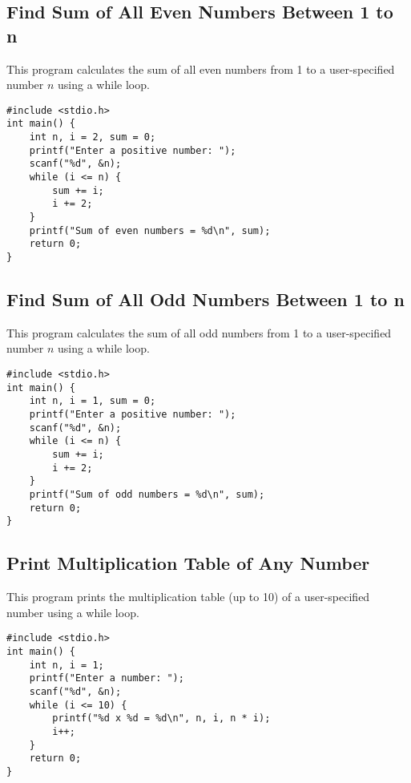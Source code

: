 \documentclass[a4paper,12pt]{article}
\begin{document}
\subsection{Find Sum of All Even Numbers Between 1 to n}
This program calculates the sum of all even numbers from 1 to a user-specified number \(n\) using a while loop.

\begin{lstlisting}[caption={Find Sum of All Even Numbers Between 1 to n}]
#include <stdio.h>
int main() {
    int n, i = 2, sum = 0;
    printf("Enter a positive number: ");
    scanf("%d", &n);
    while (i <= n) {
        sum += i;
        i += 2;
    }
    printf("Sum of even numbers = %d\n", sum);
    return 0;
}
\end{lstlisting}

\newpage

\subsection{Find Sum of All Odd Numbers Between 1 to n}
This program calculates the sum of all odd numbers from 1 to a user-specified number \(n\) using a while loop.

\begin{lstlisting}[caption={Find Sum of All Odd Numbers Between 1 to n}]
#include <stdio.h>
int main() {
    int n, i = 1, sum = 0;
    printf("Enter a positive number: ");
    scanf("%d", &n);
    while (i <= n) {
        sum += i;
        i += 2;
    }
    printf("Sum of odd numbers = %d\n", sum);
    return 0;
}
\end{lstlisting}

\newpage

\subsection{Print Multiplication Table of Any Number}
This program prints the multiplication table (up to 10) of a user-specified number using a while loop.

\begin{lstlisting}[caption={Print Multiplication Table of Any Number}]
#include <stdio.h>
int main() {
    int n, i = 1;
    printf("Enter a number: ");
    scanf("%d", &n);
    while (i <= 10) {
        printf("%d x %d = %d\n", n, i, n * i);
        i++;
    }
    return 0;
}
\end{lstlisting}

\newpage
\end{document}
